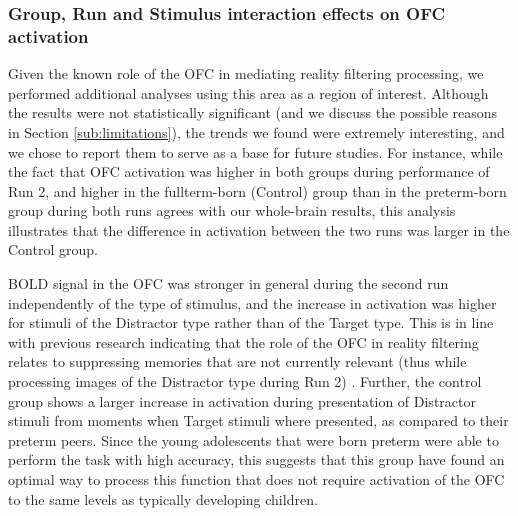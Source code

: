 \subsubsection{Group, Run and Stimulus interaction effects on OFC activation}
Given the known role of the OFC in mediating reality filtering processing, we performed additional analyses using this area as a region of interest. Although the results were not statistically significant (and we discuss the possible reasons in Section  \ref{sub:limitations}), the trends we found were extremely interesting, and we chose to report them to serve as a base for future studies. For instance, while the fact that OFC activation was higher in both groups during performance of Run 2, and higher in the fullterm-born (Control) group than in the preterm-born group during both runs agrees with our whole-brain results, this analysis illustrates that the difference in activation between the two runs was larger in the Control group. 

BOLD signal in the OFC was stronger in general during the second run independently of the type of stimulus, and the increase in activation was higher for stimuli of the Distractor type rather than of the Target type. This is in line with previous research indicating that the role of the OFC in reality filtering relates to suppressing memories that are not currently relevant (thus while processing images of the Distractor type during Run 2) \citep{Schnider2018}.  Further, the control group shows a larger increase in activation during presentation of Distractor stimuli from moments when Target stimuli where presented, as compared to their preterm peers. Since the young adolescents that were born preterm were able to perform the task with high accuracy, this suggests that this group have found an optimal way to process this function that does not require activation of the OFC to the same levels as typically developing children.


